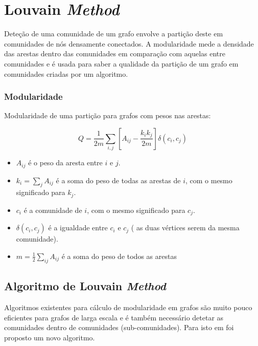 
\renewcommand{\algorithmicrequire}{\textbf{Input: }}
\renewcommand{\algorithmicensure}{\textbf{Output: }}

\section{Louvain \textit{Method}}

Deteção de uma comunidade de um grafo envolve a partição deste em comunidades de nós densamente conectados. A modularidade mede a densidade das arestas dentro das comunidades em comparação com aquelas entre comunidades e é usada para saber a qualidade da partição de um grafo em comunidades criadas por um algoritmo. 

\subsubsection{Modularidade}

Modularidade de uma partição para grafos com pesos nas arestas:

\begin{equation}
Q = \frac{1}{2m} \sum_{i,j} [ A_{ij} - \frac{k_i k_j}{2m} ] \delta(c_i ,c_j)
\label{eq:MN}
\end{equation}


\begin{itemize}
	\item $A_{ij}$ é o peso da aresta entre $i$ e $j$.
	\item $k_i = \sum_j A_{ij}$ é a soma do peso de todas as arestas de $i$, com o mesmo significado para $k_j$.
	\item $c_i$ é a comunidade de $i$, com o mesmo significado para $c_j$.
	\item $\delta(c_i,c_j)$ é a igualdade entre $c_i$ e $c_j$ ( as duas vértices serem da mesma comunidade).
	\item $m = \frac{1}{2}\sum_{ij} A_{ij}$ é a soma do peso de todos as arestas %
\end{itemize}




\subsection{Algoritmo de Louvain \textit{Method}}
Algoritmos existentes para cálculo de modularidade em grafos são muito pouco eficientes para grafos de larga escala e é também necessário detetar as comunidades dentro de comunidades (sub-comunidades). Para isto em \cite{louvainDoc} foi proposto um novo algoritmo.

